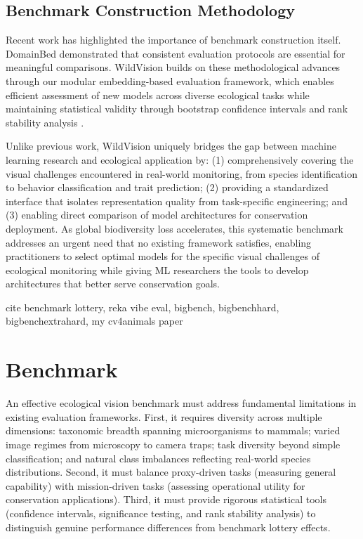 \documentclass{article}
\newcommand{\benchmarkname}{WildVision}
\begin{document}
\subsection{Benchmark Construction Methodology}

Recent work has highlighted the importance of benchmark construction itself. 
DomainBed \cite{gulrajani2021search} demonstrated that consistent evaluation protocols are essential for meaningful comparisons. 
\benchmarkname{} builds on these methodological advances through our modular embedding-based evaluation framework, which enables efficient assessment of new models across diverse ecological tasks while maintaining statistical validity through bootstrap confidence intervals and rank stability analysis \cite{lotterybenchmark}.

Unlike previous work, \benchmarkname{} uniquely bridges the gap between machine learning research and ecological application by: 
(1) comprehensively covering the visual challenges encountered in real-world monitoring, from species identification to behavior classification and trait prediction; 
(2) providing a standardized interface that isolates representation quality from task-specific engineering; and 
(3) enabling direct comparison of model architectures for conservation deployment. 
As global biodiversity loss accelerates, this systematic benchmark addresses an urgent need that no existing framework satisfies, enabling practitioners to select optimal models for the specific visual challenges of ecological monitoring while giving ML researchers the tools to develop architectures that better serve conservation goals.

\citet{wang2018glue,wang2019superglue}
cite benchmark lottery, reka vibe eval, bigbench, bigbenchhard, bigbenchextrahard, my cv4animals paper


\section{Benchmark}\label{sec:benchmark}

An effective ecological vision benchmark must address fundamental limitations in existing evaluation frameworks. 
First, it requires diversity across multiple dimensions: taxonomic breadth spanning microorganisms to mammals; varied image regimes from microscopy to camera traps; task diversity beyond simple classification; and natural class imbalances reflecting real-world species distributions. 
Second, it must balance proxy-driven tasks (measuring general capability) with mission-driven tasks (assessing operational utility for conservation applications). 
Third, it must provide rigorous statistical tools (confidence intervals, significance testing, and rank stability analysis) to distinguish genuine performance differences from benchmark lottery effects. 
\end{document}
